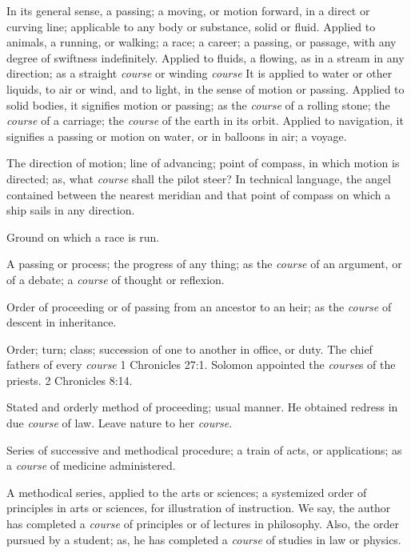 			\begin{compactitem}
				\item In its general sense, a passing; a moving, or motion forward, in a direct or curving line; applicable to any body or substance, solid or fluid. Applied to animals, a running, or walking; a race; a career; a passing, or passage, with any degree of swiftness indefinitely. Applied to fluids, a flowing, as in a stream in any direction; as a straight \textit{course} or winding \textit{course} It is applied to water or other liquids, to air or wind, and to light, in the sense of motion or passing. Applied to solid bodies, it signifies motion or passing; as the \textit{course} of a rolling stone; the \textit{course} of a carriage; the \textit{course} of the earth in its orbit. Applied to navigation, it signifies a passing or motion on water, or in balloons in air; a voyage.
				\item The direction of motion; line of advancing; point of compass, in which motion is directed; as, what \textit{course} shall the pilot steer? In technical language, the angel contained between the nearest meridian and that point of compass on which a ship sails in any direction.
				\item Ground on which a race is run.
				\item A passing or process; the progress of any thing; as the \textit{course} of an argument, or of a debate; a \textit{course} of thought or reflexion.
				\item Order of proceeding or of passing from an ancestor to an heir; as the \textit{course} of descent in inheritance.
				\item Order; turn; class; succession of one to another in office, or duty. The chief fathers of every \textit{course} 1 Chronicles 27:1. Solomon appointed the \textit{course}s of the priests. 2 Chronicles 8:14.
				\item Stated and orderly method of proceeding; usual manner. He obtained redress in due \textit{course} of law. Leave nature to her \textit{course}.
				\item Series of successive and methodical procedure; a train of acts, or applications; as a \textit{course} of medicine administered.
				\item A methodical series, applied to the arts or sciences; a systemized order of principles in arts or sciences, for illustration of instruction. We say, the author has completed a \textit{course} of principles or of lectures in philosophy. Also, the order pursued by a student; as, he has completed a \textit{course} of studies in law or physics.

\end{compactitem}
